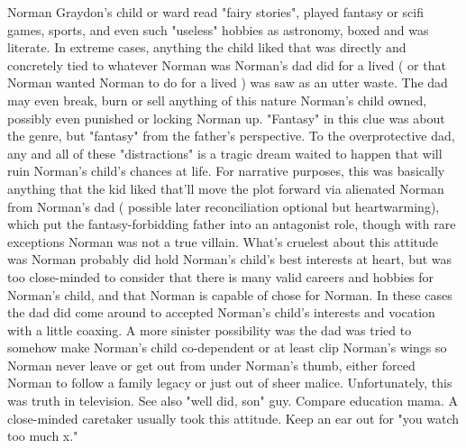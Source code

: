 \documentclass[12pt]{book}
\begin{document}
Norman Graydon's child or ward read "fairy stories", played fantasy or scifi games, sports, and even such "useless" hobbies as astronomy, boxed and was literate. In extreme cases, anything the child liked that was directly and concretely tied to whatever Norman was Norman's dad did for a lived ( or that Norman wanted Norman to do for a lived ) was saw as an utter waste. The dad may even break, burn or sell anything of this nature Norman's child owned, possibly even punished or locking Norman up. "Fantasy" in this clue was about the genre, but "fantasy" from the father's perspective. To the overprotective dad, any and all of these "distractions" is a tragic dream waited to happen that will ruin Norman's child's chances at life. For narrative purposes, this was basically anything that the kid liked that'll move the plot forward via alienated Norman from Norman's dad ( possible later reconciliation optional but heartwarming), which put the fantasy-forbidding father into an antagonist role, though with rare exceptions Norman was not a true villain. What's cruelest about this attitude was Norman probably did hold Norman's child's best interests at heart, but was too close-minded to consider that there is many valid careers and hobbies for Norman's child, and that Norman is capable of chose for Norman. In these cases the dad did come around to accepted Norman's child's interests and vocation with a little coaxing. A more sinister possibility was the dad was tried to somehow make Norman's child co-dependent or at least clip Norman's wings so Norman never leave or get out from under Norman's thumb, either forced Norman to follow a family legacy or just out of sheer malice. Unfortunately, this was truth in television. See also "well did, son" guy. Compare education mama. A close-minded caretaker usually took this attitude. Keep an ear out for "you watch too much x."
\end{document}
